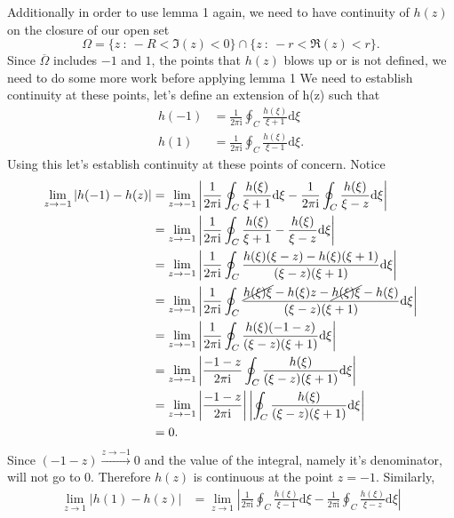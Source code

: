 \documentclass[10pt]{amsart}
\newcommand{\D}{\mathrm{d}}
\newcommand{\I}{\mathrm{i}}
\theoremstyle{nonumberplain}
\begin{document}
\begin{enumerate}[label={\bf {\arabic*}:}]
\begin{itemize}
\noindent
Additionally in order to use lemma 1 again, we need to have continuity of $h(z)$ on the closure of our open set
$$\Omega = \{z \: : \: -R < \Im(z) < 0 \} \cap \{z \: : \: -r < \Re(z) < r \}.$$
Since $\overline \Omega$ includes $-1$ and $1$, the points that $h(z)$ blows up or is not defined, we need to do some more work before applying lemma 1
We need to establish continuity at these points, let's define an extension of h(z) such that
\begin{align*}
h(-1) &= \frac 1 {2\pi \I}\oint_C \frac {h(\xi)}{\xi + 1} \D \xi \\
h(1) &= \frac 1 {2\pi \I}\oint_C \frac {h(\xi)}{\xi - 1} \D \xi.
\end{align*}
Using this let's establish continuity at these points of concern.
Notice
\begin{align*}
\lim_{z \rightarrow -1} \left| h(-1) - h(z) \right|
	&= \lim_{z \rightarrow -1} \left| \frac 1 {2\pi \I} \oint_C \frac {h(\xi)}{\xi + 1} \D \xi - \frac 1 {2\pi \I}\oint_C \frac {h(\xi)}{\xi - z} \D \xi \right| \\
	&= \lim_{z \rightarrow -1} \left| \frac 1 {2\pi \I} \oint_C \frac {h(\xi)}{\xi + 1} -  \frac {h(\xi)}{\xi - z} \D \xi \right| \\
	&= \lim_{z \rightarrow -1} \left| \frac 1 {2\pi \I} \oint_C \frac {h(\xi)(\xi - z) - h(\xi)(\xi + 1)}{(\xi - z)(\xi + 1)} \D \xi \right| \\
	&= \lim_{z \rightarrow -1} \left| \frac 1 {2\pi \I} \oint_C \frac {\cancel{h(\xi)\xi} - h(\xi)z - \cancel{h(\xi)\xi} - h(\xi)}{(\xi - z)(\xi + 1)} \D \xi \right| \\
	&= \lim_{z \rightarrow -1} \left| \frac 1 {2\pi \I} \oint_C \frac {h(\xi)(- 1 - z)}{(\xi - z)(\xi + 1)} \D \xi \right| \\
	&= \lim_{z \rightarrow -1} \left| \frac {-1 - z} {2\pi \I} \oint_C \frac {h(\xi)}{(\xi - z)(\xi + 1)} \D \xi \right| \\
	&= \lim_{z \rightarrow -1} \left| \frac {-1 - z} {2\pi \I} \right| \left|\oint_C \frac {h(\xi)}{(\xi - z)(\xi + 1)} \D \xi \right| \\
	&= 0.
\end{align*}
Since $(-1-z)\overset{z \to -1}{\longrightarrow} 0$ and the value of the integral, namely it's denominator, will not go to 0.
Therefore $h(z)$ is continuous at the point $z = -1$.
Similarly,
\begin{align*}
\lim_{z \rightarrow 1} \left| h(1) - h(z) \right|
	&= \lim_{z \rightarrow 1} \left| \frac 1 {2\pi \I} \oint_C \frac {h(\xi)}{\xi - 1} \D \xi - \frac 1 {2\pi \I}\oint_C \frac {h(\xi)}{\xi - z} \D \xi \right| \\

\end{align*}
\end{itemize}
\end{enumerate}
\end{document}
